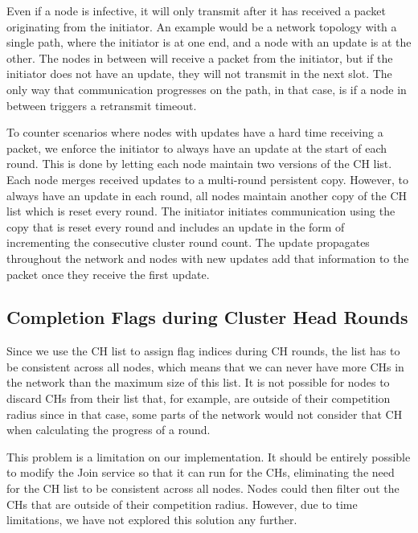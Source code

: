 Even if a node is infective, it will only transmit after it has received a packet originating from the initiator. An example would be a network topology with a single path, where the initiator is at one end, and a node with an update is at the other. The nodes in between will receive a packet from the initiator, but if the initiator does not have an update, they will not transmit in the next slot. The only way that communication progresses on the path, in that case, is if a node in between triggers a retransmit timeout.

To counter scenarios where nodes with updates have a hard time receiving a packet, we enforce the initiator to always have an update at the start of each round. This is done by letting each node maintain two versions of the CH list. Each node merges received updates to a multi-round persistent copy. However, to always have an update in each round, all nodes maintain another copy of the CH list which is reset every round. The initiator initiates communication using the copy that is reset every round and includes an update in the form of incrementing the consecutive cluster round count. The update propagates throughout the network and nodes with new updates add that information to the packet once they receive the first update.


\subsection{Completion Flags during Cluster Head Rounds}
Since we use the CH list to assign flag indices during CH rounds, the list has to be consistent across all nodes, which means that we can never have more CHs in the network than the maximum size of this list. It is not possible for nodes to discard CHs from their list that, for example, are outside of their competition radius since in that case, some parts of the network would not consider that CH when calculating the progress of a round.

This problem is a limitation on our implementation. It should be entirely possible to modify the Join service so that it can run for the CHs, eliminating the need for the CH list to be consistent across all nodes. Nodes could then filter out the CHs that are outside of their competition radius. However, due to time limitations, we have not explored this solution any further.
